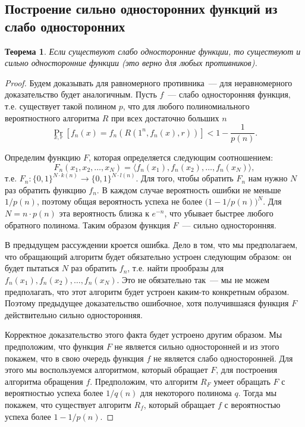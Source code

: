 \documentclass[12pt,a4paper]{article}
\newcommand{\bits}{\{0,1\}}
\theoremstyle{definition}
\theoremstyle{plain}
\newtheorem{theorem}{Теорема}[section]
\theoremstyle{remark}
\begin{document}
\subsection{Построение сильно односторонних функций из слабо односторонних}
\begin{theorem}
Если существуют слабо односторонние функции, то существуют и сильно односторонние функции (это верно для любых противников).
\end{theorem}
\begin{proof}
Будем доказывать для равномерного противника~--- для неравномерного доказательство будет аналогичным. 
Пусть $f$~--- слабо односторонняя функция, т.е.
существует такой полином $p$, что для любого полиномиального вероятностного алгоритма $R$
при всех достаточно больших $n$
$$\Pr_{x,r}[f_n(x) = f_n(R(1^n, f_n(x), r))] < 1 - \frac{1}{p(n)}.$$

Определим функцию $F$, которая определяется следующим соотношением:
$$F_n(x_1,x_2,\dotsc,x_N) = \langle f_n(x_1), f_n(x_2), \dotsc, f_n(x_N) \rangle,$$
т.е. $F_n : \bits^{N\cdot k(n)} \to \bits^{N\cdot l(n)}$. Для того, чтобы обратить $F_n$ нам нужно $N$ раз обратить функцию $f_n$. В каждом случае вероятность ошибки не меньше $1/p(n)$, поэтому общая вероятность успеха не более $\bigl(1-1/p(n)\bigr)^N$.
Для $N = n\cdot p(n)$ эта вероятность близка к $e^{-n}$, что убывает быстрее любого обратного полинома.
Таким образом функция $F$~--- сильно односторонняя.

В предыдущем рассуждении кроется ошибка. Дело в том, что мы предполагаем, что обращающий
алгоритм будет обязательно устроен следующим образом: он будет пытаться $N$ раз обратить
$f_n$, т.е. найти прообразы для $f_n(x_1),f_n(x_2),\dotsc,f_n(x_N)$. 
Это не обязательно так~--- мы не можем предполагать, что этот алгоритм будет
устроен каким-то конкретным образом. Поэтому предыдущее доказательство ошибочное, 
хотя получившаяся функция $F$ действительно сильно односторонняя.

Корректное доказательство этого факта будет устроено другим образом. Мы предположим, что
функция $F$ не является сильно односторонней и из этого покажем, что в свою
очередь функция $f$ не является слабо односторонней. Для этого мы воспользуемся
алгоритмом, который обращает $F$, для построения алгоритма обращения $f$. 
Предположим, что алгоритм $R_F$ умеет обращать $F$ с вероятностью успеха 
более $1/q(n)$ для некоторого полинома $q$. Тогда мы покажем, что 
существует алгоритм $R_f$, который обращает $f$ с вероятностью успеха более
$1 - 1/p(n)$.


\end{proof}
\end{document}
